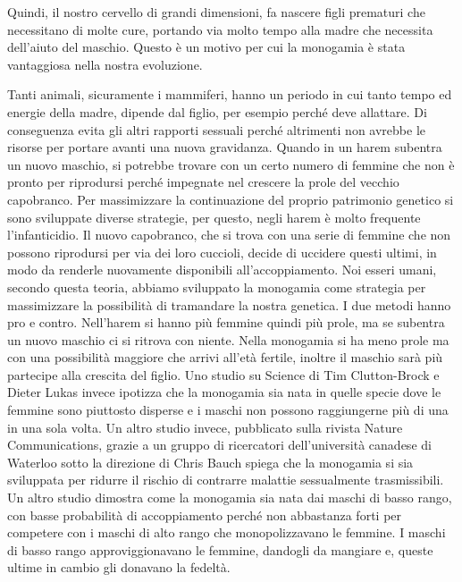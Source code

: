 \documentclass[12pt]{book} %
\begin{document}
Quindi, il nostro cervello di grandi dimensioni, fa nascere figli prematuri che necessitano di molte cure, portando via
molto tempo alla madre che necessita dell'aiuto del maschio. Questo è un motivo per cui la monogamia è stata vantaggiosa nella nostra evoluzione.

Tanti animali, sicuramente i mammiferi, hanno un periodo in cui tanto tempo ed energie della madre, dipende dal figlio, per esempio perché deve
allattare. Di conseguenza evita gli altri rapporti sessuali perché altrimenti non avrebbe le risorse per portare avanti una nuova gravidanza. Quando in un harem subentra un nuovo maschio, si potrebbe trovare con un certo numero
di femmine che non è pronto per riprodursi perché impegnate nel crescere la prole del vecchio capobranco. Per massimizzare
la continuazione del proprio patrimonio genetico si sono sviluppate diverse strategie, per questo, negli harem è molto
frequente l'infanticidio. Il nuovo capobranco, che si trova con una serie di femmine che non
possono riprodursi per via dei loro cuccioli, decide di uccidere questi ultimi, in modo da renderle nuovamente
disponibili all'accoppiamento. Noi esseri umani, secondo questa teoria, abbiamo
sviluppato la monogamia come strategia per massimizzare la possibilità di tramandare la nostra genetica. I due metodi
hanno pro e contro. Nell'harem si hanno più femmine quindi più prole, ma se subentra un nuovo
maschio ci si ritrova con niente. Nella monogamia si ha meno prole ma con una possibilità maggiore che arrivi
all'età fertile, inoltre il maschio sarà più partecipe alla crescita del figlio. Uno studio su
Science di Tim Clutton-Brock e Dieter Lukas invece ipotizza
che la monogamia sia nata in quelle specie dove le femmine sono piuttosto disperse e i maschi non possono raggiungerne
più di una in una sola volta. Un altro studio invece, pubblicato sulla rivista Nature Communications, grazie a un
gruppo di ricercatori dell'università canadese di Waterloo sotto la direzione di Chris Bauch
spiega che la monogamia si sia sviluppata per ridurre il rischio di contrarre malattie sessualmente
trasmissibili. Un altro studio dimostra come la monogamia sia
nata dai maschi di basso rango, con basse probabilità di accoppiamento perché non abbastanza forti per competere con i
maschi di alto rango che monopolizzavano le femmine. I maschi di basso rango approviggionavano le femmine, dandogli da
mangiare e, queste ultime in cambio gli donavano la fedeltà.
\end{document}
